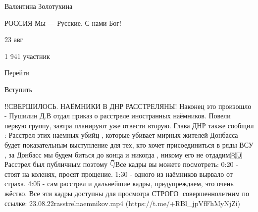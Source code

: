  
 
 
 
 

Валентина Золотухина

РОССИЯ Мы — Русские. С нами Бог!

23 авг

1 941 участник

Перейти

Вступить

‼СВЕРШИЛОСЬ. НАЁМНИКИ В ДНР РАССТРЕЛЯНЫ!
Наконец это произошло - Пушилин Д.В отдал приказ о расстреле иностранных наёмников. Повели первую группу, завтра планируют уже отвести вторую.
Глава ДНР также сообщил :
Расстрел этих наемных убийц , которые убивает мирных жителей Донбасса будет показательным выступление для тех, кто хочет присоединиться в ряды ВСУ , за Донбасс мы будем биться до конца и никогда , никому его не отдадим🇷🇺
Расстрел был публичным поэтому 👇Все кадры вы можете посмотреть:
0:20 - стоят на коленях, просят прощение.
1:30 - одного из наёмников вырвало от страха.
4:05 - сам расстрел и дальнейшие кадры, предупреждаем, это очень жёстко.
Все эти кадры доступны для просмотра СТРОГО 🔞совершеннолетним по ссылке:
23.08.22rasstrelnaemnikov.mp4 (https://t.me/+RBl_jpVfFhMyNjZi)
